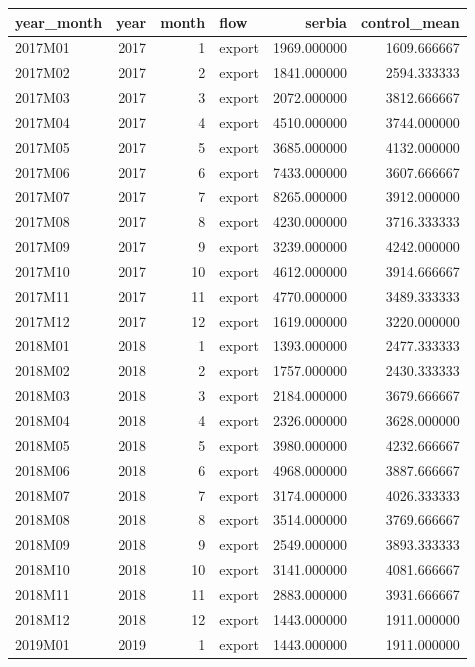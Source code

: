 \begin{tabular}{lrrlrr}
\toprule
year_month & year & month & flow & serbia & control_mean \\
\midrule
2017M01 & 2017 & 1 & export & 1969.000000 & 1609.666667 \\
2017M02 & 2017 & 2 & export & 1841.000000 & 2594.333333 \\
2017M03 & 2017 & 3 & export & 2072.000000 & 3812.666667 \\
2017M04 & 2017 & 4 & export & 4510.000000 & 3744.000000 \\
2017M05 & 2017 & 5 & export & 3685.000000 & 4132.000000 \\
2017M06 & 2017 & 6 & export & 7433.000000 & 3607.666667 \\
2017M07 & 2017 & 7 & export & 8265.000000 & 3912.000000 \\
2017M08 & 2017 & 8 & export & 4230.000000 & 3716.333333 \\
2017M09 & 2017 & 9 & export & 3239.000000 & 4242.000000 \\
2017M10 & 2017 & 10 & export & 4612.000000 & 3914.666667 \\
2017M11 & 2017 & 11 & export & 4770.000000 & 3489.333333 \\
2017M12 & 2017 & 12 & export & 1619.000000 & 3220.000000 \\
2018M01 & 2018 & 1 & export & 1393.000000 & 2477.333333 \\
2018M02 & 2018 & 2 & export & 1757.000000 & 2430.333333 \\
2018M03 & 2018 & 3 & export & 2184.000000 & 3679.666667 \\
2018M04 & 2018 & 4 & export & 2326.000000 & 3628.000000 \\
2018M05 & 2018 & 5 & export & 3980.000000 & 4232.666667 \\
2018M06 & 2018 & 6 & export & 4968.000000 & 3887.666667 \\
2018M07 & 2018 & 7 & export & 3174.000000 & 4026.333333 \\
2018M08 & 2018 & 8 & export & 3514.000000 & 3769.666667 \\
2018M09 & 2018 & 9 & export & 2549.000000 & 3893.333333 \\
2018M10 & 2018 & 10 & export & 3141.000000 & 4081.666667 \\
2018M11 & 2018 & 11 & export & 2883.000000 & 3931.666667 \\
2018M12 & 2018 & 12 & export & 1443.000000 & 1911.000000 \\
2019M01 & 2019 & 1 & export & 1443.000000 & 1911.000000 \\

\end{tabular}
